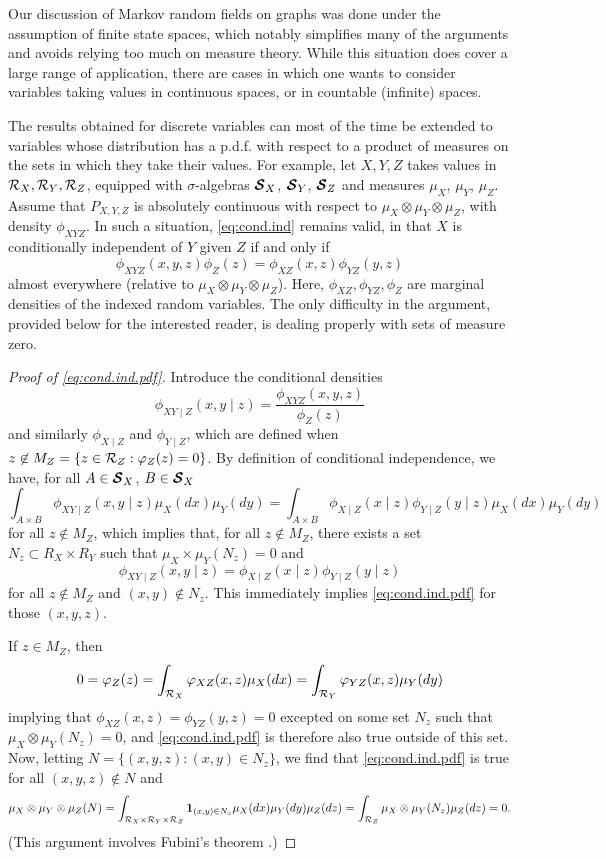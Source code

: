 Our discussion of Markov random fields on graphs was done under the assumption of finite state spaces, which notably simplifies many of the arguments and avoids relying too much on measure theory. 
While this situation does cover a large range of application, there are cases in which one wants to consider variables taking values in continuous spaces, or in countable (infinite) spaces.

The results obtained for discrete variables can most of the time be extended to variables whose distribution has a p.d.f. with respect to a product of measures on the sets in which they take their values. For example, let $X, Y, Z$ takes values in ${\mathcal R}_X, {\mathcal R}_Y, {\mathcal R}_Z$, equipped with $\sigma$-algebras $\bm{{\mathcal S}}_X$, $\bm{{\mathcal S}}_Y$, $\bm{{\mathcal S}}_Z$ and measures $\mu_X$, $\mu_Y$, $\mu_Z$. Assume that $P_{X,Y,Z}$ is absolutely continuous with respect to $\mu_X\otimes \mu_Y\otimes \mu_Z$, with density $\phi_{XYZ}$. In such a situation, \cref{eq:cond.ind} remains valid, in that $X$ is conditionally independent of $Y$ given $Z$ if and only if
\begin{equation}
\label{eq:cond.ind.pdf}
\phi_{XYZ}(x,y,z) \phi_Z(z) = \phi_{XZ}(x,z) \phi_{YZ}(y,z)
\end{equation}
almost everywhere (relative to $\mu_X\otimes \mu_Y\otimes \mu_Z$). Here, $\phi_{XZ}, \phi_{YZ}, \phi_Z$ are marginal densities of the indexed random variables. The only difficulty in the argument, provided below for the interested reader, is dealing properly with sets of measure zero. 
\begin{proof}[Proof of \cref{eq:cond.ind.pdf}]
 Introduce the conditional densities
\[
\phi_{XY\mid Z}(x,y\mid z) = \frac{\phi_{XYZ}(x,y,z)}{\phi_Z(z)}
\]
and similarly $\phi_{X\mid Z}$ and $\phi_{Y\mid Z}$, which are defined when $z\not \in M_Z = \{z\in {\mathcal R}_Z: \varphi_Z(z) = 0\}$.  By definition of conditional independence, we have, for all $A \in \bm{{\mathcal S}}_X$, $B\in \bm{{\mathcal S}}_X$
\[
\int_{A\times B} \phi_{XY\mid Z}(x,y\mid z) \mu_X(dx)\mu_Y(dy) = 
\int_{A\times B} \phi_{X\mid Z}(x\mid z)\phi_{Y\mid Z}(y\mid z) \mu_X(dx)\mu_Y(dy) 
\]
for all $z\not \in M_Z$, which implies that, for all $z\not \in M_Z$, there exists a set $N_z\subset R_X\times R_Y$ such that $\mu_X\times \mu_Y(N_z) = 0$ and
\[
\phi_{XY\mid Z}(x,y\mid z) = \phi_{X\mid Z}(x\mid z)\phi_{Y\mid Z}(y\mid z)
\]
for all $z\not \in M_Z$ and $(x,y)\not \in N_z$. This immediately implies \cref{eq:cond.ind.pdf} for those $(x,y,z)$.  

If $z\in M_Z$, then 
\[
0 = \varphi_Z(z) = \int_{{\mathcal R}_X} \varphi_{XZ}(x,z) \mu_X(dx) = \int_{{\mathcal R}_Y} \varphi_{YZ}(x,z) \mu_Y(dy)
\]
implying that $\phi_{XZ}(x,z) = \phi_{YZ}(y, z) = 0$  excepted on some set $N_z$ such that $\mu_{X}\otimes \mu_Y(N_z) = 0$, and \cref{eq:cond.ind.pdf} is therefore also true outside of this set. Now, letting $N = \{(x,y,z): (x,y) \in N_z\}$, we find that \cref{eq:cond.ind.pdf} is true for all $(x,y,z) \not \in N$ and
\[
\mu_X\otimes \mu_Y \otimes \mu_Z(N) = \int_{{\mathcal R}_X\times {\mathcal R}_Y\times {\mathcal R}_Z} {\bm 1}_{(x,y)\in N_z} \mu_X(dx)\mu_Y(dy)\mu_Z(dz) = \int_{{\mathcal R}_Z}\mu_X\otimes \mu_Y(N_z)\mu_Z(dz) = 0.
\] 
(This argument involves Fubini's theorem \cite{rudin1966real}.)
\end{proof} 
